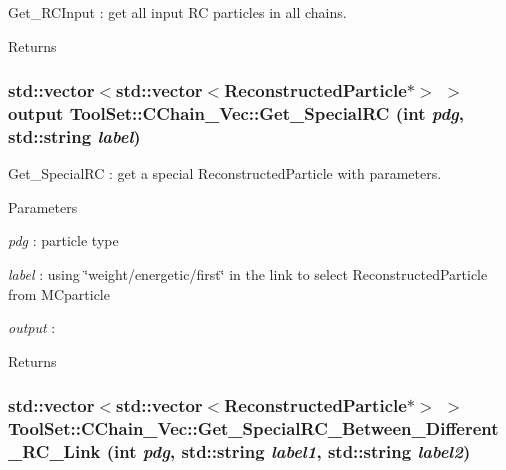 Get\_\-RCInput : get all input RC particles in all chains. \begin{DoxyReturn}{Returns}

\end{DoxyReturn}
\hypertarget{classToolSet_1_1CChain__Vec_a6c296f6a145769c5a8d9fd7ab6d1c5be}{
\subsubsection[{Get\_\-SpecialRC}]{\setlength{\rightskip}{0pt plus 5cm}std::vector$<$std::vector$<$ReconstructedParticle$\ast$$>$ $>$ output ToolSet::CChain\_\-Vec::Get\_\-SpecialRC (int {\em pdg}, \/  std::string {\em label})}}
\label{classToolSet_1_1CChain__Vec_a6c296f6a145769c5a8d9fd7ab6d1c5be}


Get\_\-SpecialRC : get a special ReconstructedParticle with parameters. 
\begin{DoxyParams}{Parameters}
\item[{\em pdg}]: particle type \item[{\em label}]: using \char`\"{}weight/energetic/first\char`\"{} in the link to select ReconstructedParticle from MCparticle \item[{\em output}]:\end{DoxyParams}
\begin{DoxyReturn}{Returns}

\end{DoxyReturn}
\hypertarget{classToolSet_1_1CChain__Vec_abf7fb35af91c6059d381d5a278a96574}{
\subsubsection[{Get\_\-SpecialRC\_\-Between\_\-Different\_\-RC\_\-Link}]{\setlength{\rightskip}{0pt plus 5cm}std::vector$<$std::vector$<$ReconstructedParticle$\ast$$>$ $>$ ToolSet::CChain\_\-Vec::Get\_\-SpecialRC\_\-Between\_\-Different\_\-RC\_\-Link (int {\em pdg}, \/  std::string {\em label1}, \/  std::string {\em label2})}}
\label{classToolSet_1_1CChain__Vec_abf7fb35af91c6059d381d5a278a96574}


